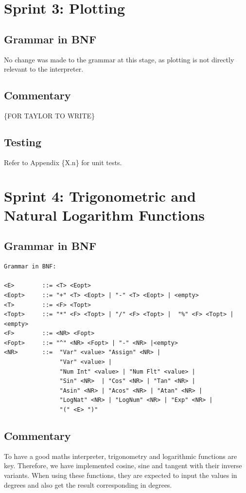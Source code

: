 \documentclass[a4paper, oneside, 11pt]{report}
\begin{document}
    \section{Sprint 3: Plotting}
    \subsection{Grammar in BNF}
    No change was made to the grammar at this stage, as plotting is not directly relevant to the interpreter.

    \subsection{Commentary}
    \{FOR TAYLOR TO WRITE\}

    \subsection{Testing}
    Refer to Appendix \{X.n\} for unit tests.

    \clearpage
    \section{Sprint 4: Trigonometric and Natural Logarithm Functions}
    \subsection{Grammar in BNF}
    \begin{verbatim}
Grammar in BNF:

<E>        ::= <T> <Eopt>
<Eopt>     ::= "+" <T> <Eopt> | "-" <T> <Eopt> | <empty>
<T>        ::= <F> <Topt>
<Topt>     ::= "*" <F> <Topt> | "/" <F> <Topt> |  "%" <F> <Topt> |<empty>
<F>        ::= <NR> <Fopt>
<Fopt>     ::= "^" <NR> <Fopt> | "-" <NR> |<empty>
<NR>       ::=  "Var" <value> "Assign" <NR> |
                "Var" <value> |
                "Num Int" <value> | "Num Flt" <value> |
                "Sin" <NR>  | "Cos" <NR> | "Tan" <NR> |
                "Asin" <NR> | "Acos" <NR> | "Atan" <NR> |
                "LogNat" <NR> | "LogNum" <NR> | "Exp" <NR> |
                "(" <E> ")"
    \end{verbatim}
    \subsection{Commentary}
    To have a good maths interpreter, trigonometry and logarithmic functions are key. Therefore, we have implemented cosine, sine and tangent with their inverse variants. When using these functions, they are expected to input the values in degrees and also get the result corresponding in degrees.
\end{document}
